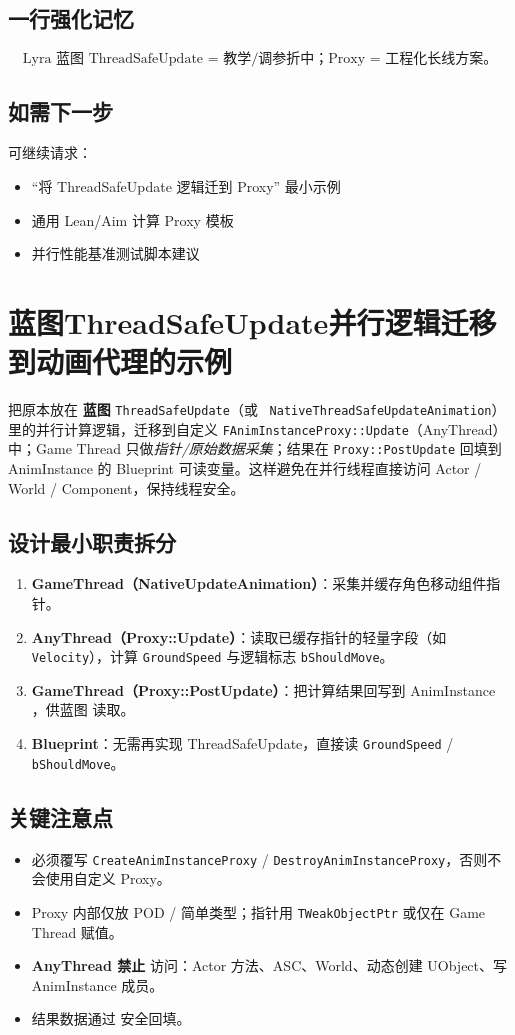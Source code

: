 \documentclass[10pt,openright,oneside,CJKmath]{MyBook}
\begin{document}
\subsection{一行强化记忆}
\[
\boxed{\text{Lyra 蓝图 ThreadSafeUpdate = 教学/调参折中；Proxy = 工程化长线方案。}}
\]

\subsection{如需下一步}
可继续请求：
\begin{itemize}
  \item “将 ThreadSafeUpdate 逻辑迁到 Proxy” 最小示例
  \item 通用 Lean/Aim 计算 Proxy 模板
  \item 并行性能基准测试脚本建议
\end{itemize}

\section{蓝图ThreadSafeUpdate并行逻辑迁移到动画代理的示例}
把原本放在 \textbf{蓝图} \texttt{ThreadSafeUpdate}（或 \cppsign~\texttt{NativeThreadSafeUpdateAnimation}）里的并行计算逻辑，迁移到自定义 \texttt{FAnimInstanceProxy::Update}（AnyThread）中；Game Thread 只做\emph{指针/原始数据采集}；结果在 \texttt{Proxy::PostUpdate} 回填到 AnimInstance 的 Blueprint 可读变量。这样避免在并行线程直接访问 Actor / World / Component，保持线程安全。

\subsection{设计最小职责拆分}
\begin{enumerate}
  \item \textbf{GameThread（NativeUpdateAnimation）}：采集并缓存角色移动组件指针。
  \item \textbf{AnyThread（Proxy::Update）}：读取已缓存指针的轻量字段（如 \texttt{Velocity}），计算 \texttt{GroundSpeed} 与逻辑标志 \texttt{bShouldMove}。
  \item \textbf{GameThread（Proxy::PostUpdate）}：把计算结果回写到 AnimInstance ，供蓝图  读取。
  \item \textbf{Blueprint}：无需再实现 ThreadSafeUpdate，直接读 \texttt{GroundSpeed} / \texttt{bShouldMove}。
\end{enumerate}

\subsection{关键注意点}
\begin{itemize}
  \item 必须覆写 \texttt{CreateAnimInstanceProxy} / \texttt{DestroyAnimInstanceProxy}，否则不会使用自定义 Proxy。
  \item Proxy 内部仅放 POD / 简单类型；指针用 \texttt{TWeakObjectPtr} 或仅在 Game Thread 赋值。
  \item \textbf{AnyThread 禁止} 访问：Actor 方法、ASC、World、动态创建 UObject、写 AnimInstance 成员。
  \item 结果数据通过  安全回填。
\end{itemize}
\end{document}
